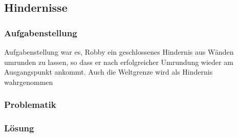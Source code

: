 \subsection{Hindernisse}

\subsubsection*{Aufgabenstellung}
Aufgabenstellung war es, Robby ein geschlossenes Hindernis aus Wänden umrunden zu lassen, so dass er nach erfolgreicher Umrundung wieder am Ausgangspunkt ankommt.
Auch die Weltgrenze wird als Hindernis wahrgenommen

\subsubsection*{Problematik}

\subsubsection*{Lösung}
